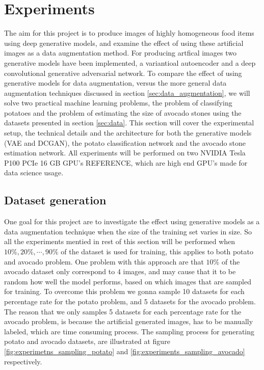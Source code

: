 \documentclass[11pt]{article}
\begin{document}
\section{Experiments}\label{sec:experiments}

The aim for this project is to produce images of highly homogeneous food items using deep generative models, and examine the effect of using these artificial images as a data augmentation method. For producing artfical images two generative models have been implemented, a variantioal autoencoder and a deep convolutional generative adversarial network. To compare the effect of using generative models for data augmentation, versus the more general data augmentation techniques discussed in section \ref{sec:data_augmentation}, we will solve two practical machine learning problems, the problem of classifying potatoes and the problem of estimating the size of avocado stones using the datasets presented in section \ref{sec:data}. This section will cover the experimental setup, the technical details and the architecture for both the generative models (VAE and DCGAN), the potato classification network and the avocado stone estimation network.
All experiments will be performed on two NVIDIA Tesla P100 PCIe 16 GB GPU's REFERENCE, which are high end GPU's made for data science usage.


\subsection{Dataset generation}

One goal for this project are to investigate the effect using generative models as a data augmentation technique when the size of the training set varies in size. So all the experiments mentied in rest of this section will be performed when $10\%, 20\%, \cdots, 90\% $ of the dataset is used for training, this applies to both potato and avocado problem. One problem with this approach are that $10\%$ of the avocado dataset only correspond to 4 images, and may cause that it to be random how well the model performs, based on which images that are sampled for training. To overcome this problem we gonna sample 10 datasets for each percentage rate for the potato problem, and 5 datasets for the avocado problem. The reason that we only samples 5 datasets for each percentage rate for the avocado problem, is because the artificial generated images, has to be manually labeled, which are time consuming process. The sampling process for generating potato and avocado datasets, are illustrated at figure \ref{fig:experimetns_sampling_potato} and \ref{fig:experiments_sampling_avocado} respectively.
\end{document}
